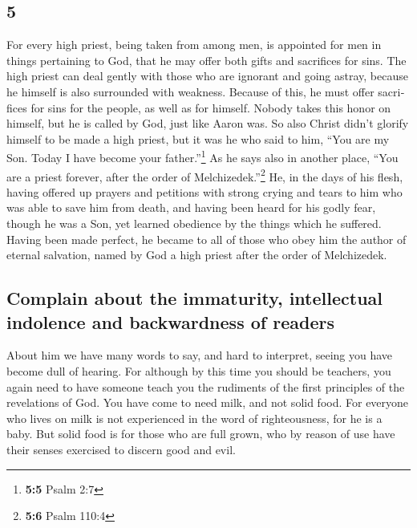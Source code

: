 \begin{paracol}{2}
\begin{otherlanguage}{english}
\hypertarget{section-9}{%
\section{5}\label{section-9}}

 For every high priest, being taken from among men, is
appointed for men in things pertaining to God, that he may offer both
gifts and sacrifices for sins.  The high priest can deal
gently with those who are ignorant and going astray, because he himself
is also surrounded with weakness.  Because of this, he
must offer sacrifices for sins for the people, as well as for himself.
 Nobody takes this honor on himself, but he is called by
God, just like Aaron was.  So also Christ didn't glorify
himself to be made a high priest, but it was he who said to him, ``You
are my Son. Today I have become your father.''\footnote{\textbf{5:5}
  Psalm 2:7}  As he says also in another place, ``You are
a priest forever, after the order of Melchizedek.''\footnote{\textbf{5:6}
  Psalm 110:4}  He, in the days of his flesh, having
offered up prayers and petitions with strong crying and tears to him who
was able to save him from death, and having been heard for his godly
fear,  though he was a Son, yet learned obedience by the
things which he suffered.  Having been made perfect, he
became to all of those who obey him the author of eternal salvation,
 named by God a high priest after the order of
Melchizedek.

\hypertarget{complain-about-the-immaturity-intellectual-indolence-and-backwardness-of-readers}{%
\subsection{Complain about the immaturity, intellectual indolence and
backwardness of
readers}\label{complain-about-the-immaturity-intellectual-indolence-and-backwardness-of-readers}}

 About him we have many words to say, and hard to
interpret, seeing you have become dull of hearing.  For
although by this time you should be teachers, you again need to have
someone teach you the rudiments of the first principles of the
revelations of God. You have come to need milk, and not solid food.
 For everyone who lives on milk is not experienced in the
word of righteousness, for he is a baby.  But solid food
is for those who are full grown, who by reason of use have their senses
exercised to discern good and evil.


\end{otherlanguage}
\end{paracol}

